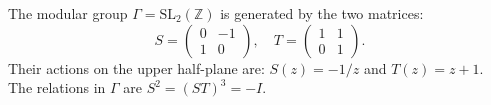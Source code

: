 The modular group $\Gamma = \mathrm{SL}_2(\mathbb{Z})$ is generated by the two matrices:
$$S = \begin{pmatrix} 0 & -1 \\ 1 & 0 \end{pmatrix}, \quad T = \begin{pmatrix} 1 & 1 \\ 0 & 1 \end{pmatrix}.$$
Their actions on the upper half-plane are: $S(z) = -1/z$ and $T(z) = z + 1$. The relations in $\Gamma$ are $S^2 = (ST)^3 = -I$.
